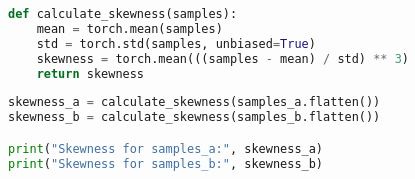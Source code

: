 \documentclass{article}
\begin{document}
\begin{lstlisting}[language=Python, caption=Función de Skewness]
def calculate_skewness(samples):
    mean = torch.mean(samples)
    std = torch.std(samples, unbiased=True)
    skewness = torch.mean(((samples - mean) / std) ** 3)
    return skewness
\end{lstlisting}

\begin{lstlisting}[language=Python, caption=Llamado de función]
skewness_a = calculate_skewness(samples_a.flatten())
skewness_b = calculate_skewness(samples_b.flatten())

print("Skewness for samples_a:", skewness_a)
print("Skewness for samples_b:", skewness_b)
\end{lstlisting}
\end{document}
